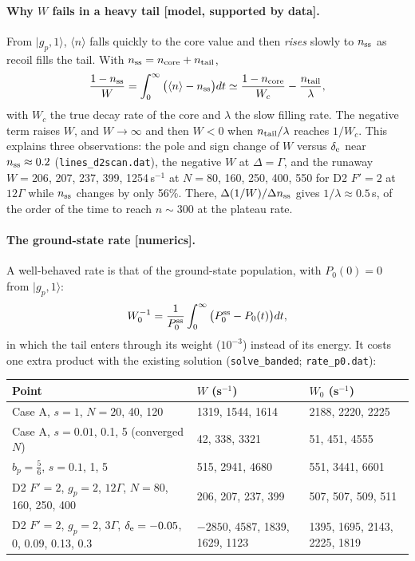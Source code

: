 \documentclass[11pt,a4paper]{article}
\newcommand{\ket}[1]{|#1\rangle}
\begin{document}
\paragraph{Why $W$ fails in a heavy tail [model, supported by data].} From $\ket{g_p,1}$, $\langle n\rangle$ falls quickly to the core value and then \emph{rises} slowly to $n_{\rm ss}$ as recoil fills the tail. With $n_{\rm ss}=n_{\rm core}+n_{\rm tail}$,
\begin{equation}
  \frac{1-n_{\rm ss}}{W}=\int_0^\infty\big(\langle n\rangle-n_{\rm ss}\big)dt\simeq\frac{1-n_{\rm core}}{W_c}-\frac{n_{\rm tail}}{\lambda},
\end{equation}
with $W_c$ the true decay rate of the core and $\lambda$ the slow filling rate. The negative term raises $W$, and $W\to\infty$ and then $W<0$ when $n_{\rm tail}/\lambda$ reaches $1/W_c$. This explains three observations: the pole and sign change of $W$ versus $\delta_{\rm e}$ near $n_{\rm ss}\approx0.2$ (\texttt{lines\_d2scan.dat}), the negative $W$ at $\Delta=\Gamma$, and the runaway $W=206$, 207, 237, 399, 1254\,s$^{-1}$ at $N=80$, 160, 250, 400, 550 for D2 $F'=2$ at $12\Gamma$ while $n_{\rm ss}$ changes by only 56\%. There, $\Delta(1/W)/\Delta n_{\rm ss}$ gives $1/\lambda\approx0.5$\,s, of the order of the time to reach $n\sim300$ at the plateau rate.

\paragraph{The ground-state rate [numerics].} A well-behaved rate is that of the ground-state population, with $P_0(0)=0$ from $\ket{g_p,1}$:
\begin{equation}
  W_0^{-1}=\frac{1}{P_0^{\rm ss}}\int_0^\infty\big(P_0^{\rm ss}-P_0(t)\big)dt ,
  \label{eq:W0}
\end{equation}
in which the tail enters through its weight ($10^{-3}$) instead of its energy. It costs one extra product with the existing solution (\texttt{solve\_banded}; \texttt{rate\_p0.dat}):

\begin{center}\small
\begin{tabularx}{\textwidth}{@{}Xll@{}}
\toprule
Point & $W$ (s$^{-1}$) & $W_0$ (s$^{-1}$)\\
\midrule
Case A, $s=1$, $N=20$, 40, 120 & 1319, 1544, 1614 & 2188, 2220, 2225\\
Case A, $s=0.01$, 0.1, 5 (converged $N$) & 42, 338, 3321 & 51, 451, 4555\\
$b_p=\tfrac56$, $s=0.1$, 1, 5 & 515, 2941, 4680 & 551, 3441, 6601\\
D2 $F'=2$, $g_p=2$, $12\Gamma$, $N=80$, 160, 250, 400 & 206, 207, 237, 399 & 507, 507, 509, 511\\
D2 $F'=2$, $g_p=2$, $3\Gamma$, $\delta_{\rm e}=-0.05$, 0, 0.09, 0.13, 0.3 & $-2850$, 4587, 1839, 1629, 1123 & 1395, 1695, 2143, 2225, 1819\\
\bottomrule
\end{tabularx}
\end{center}
\end{document}
